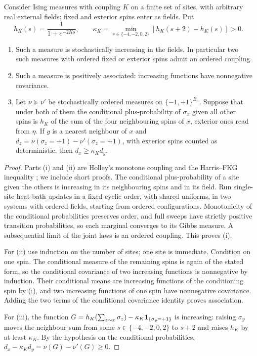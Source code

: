 \begin{lemma}\label{lem:neighbor}
Consider Ising measures with coupling $K$ on a finite set of sites, with arbitrary real external fields; fixed and exterior spins enter as fields. Put
\[
 h_K(s)=\frac1{1+e^{-2Ks}},\qquad
 \kappa_K=\min_{s\in\{-4,-2,0,2\}}[h_K(s+2)-h_K(s)]>0.
\]
\begin{enumerate}
\item Such a measure is stochastically increasing in the fields. In particular two such measures with ordered fixed or exterior spins admit an ordered coupling.
\item Such a measure is positively associated: increasing functions have nonnegative covariance.
\item Let $\nu\succeq\nu'$ be stochastically ordered measures on $\{-1,+1\}^{B_n}$. Suppose that under both of them the conditional plus-probability of $\sigma_x$ given all other spins is $h_K$ of the sum of the four neighbouring spins of $x$, exterior ones read from $\eta$. If $y$ is a nearest neighbour of $x$ and $d_z=\nu(\sigma_z=+1)-\nu'(\sigma_z=+1)$, with exterior spins counted as deterministic, then $d_x\ge\kappa_Kd_y$.
\end{enumerate}
\end{lemma}
\begin{proof}
Parts (i) and (ii) are Holley's monotone coupling \cite{Holley74} and the Harris--FKG inequality \cite{Harris60,FKG71}; we include short proofs. The conditional plus-probability of a site given the others is increasing in its neighbouring spins and in its field. Run single-site heat-bath updates in a fixed cyclic order, with shared uniforms, in two systems with ordered fields, starting from ordered configurations. Monotonicity of the conditional probabilities preserves order, and full sweeps have strictly positive transition probabilities, so each marginal converges to its Gibbs measure. A subsequential limit of the joint laws is an ordered coupling. This proves (i).

For (ii) use induction on the number of sites; one site is immediate. Condition on one spin. The conditional measure of the remaining spins is again of the stated form, so the conditional covariance of two increasing functions is nonnegative by induction. Their conditional means are increasing functions of the conditioning spin by (i), and two increasing functions of one spin have nonnegative covariance. Adding the two terms of the conditional covariance identity proves association.

For (iii), the function $G=h_K(\sum_{z\sim x}\sigma_z)-\kappa_K\mathbf 1_{\{\sigma_y=+1\}}$ is increasing: raising $\sigma_y$ moves the neighbour sum from some $s\in\{-4,-2,0,2\}$ to $s+2$ and raises $h_K$ by at least $\kappa_K$. By the hypothesis on the conditional probabilities, $d_x-\kappa_Kd_y=\nu(G)-\nu'(G)\ge0$.
\end{proof}

